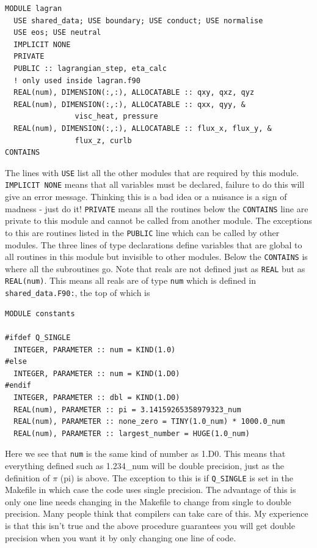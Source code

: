 \documentclass[11pt]{article}
\begin{document}
\begin{verbatim}
MODULE lagran
  USE shared_data; USE boundary; USE conduct; USE normalise
  USE eos; USE neutral
  IMPLICIT NONE
  PRIVATE
  PUBLIC :: lagrangian_step, eta_calc
  ! only used inside lagran.f90
  REAL(num), DIMENSION(:,:), ALLOCATABLE :: qxy, qxz, qyz
  REAL(num), DIMENSION(:,:), ALLOCATABLE :: qxx, qyy, &
                visc_heat, pressure
  REAL(num), DIMENSION(:,:), ALLOCATABLE :: flux_x, flux_y, &
                flux_z, curlb
CONTAINS
\end{verbatim}
The lines with \texttt{USE} list all the other modules that are required by this module. \texttt{IMPLICIT NONE} means that all variables must be declared, failure to do this will give an error message. Thinking this is a bad idea or a nuisance is a sign of madness - just do it! \texttt{PRIVATE} means all the routines below the \texttt{CONTAINS} line are private to this module and cannot be called from another module. The exceptions to this are routines listed in the \texttt{PUBLIC} line which can be called by other modules. The three lines of type declarations define variables that are global to all routines in this module but invisible to other modules. Below the \texttt{CONTAINS} is where all the subroutines go. Note that reals are not defined just as \texttt{REAL} but as \texttt{REAL(num)}. This means all reals are of type \texttt{num} which is defined in {\texttt{shared\_data.F90:}}, the top of which is
\begin{verbatim}
MODULE constants

#ifdef Q_SINGLE
  INTEGER, PARAMETER :: num = KIND(1.0) 
#else
  INTEGER, PARAMETER :: num = KIND(1.D0) 
#endif
  INTEGER, PARAMETER :: dbl = KIND(1.D0)
  REAL(num), PARAMETER :: pi = 3.14159265358979323_num
  REAL(num), PARAMETER :: none_zero = TINY(1.0_num) * 1000.0_num
  REAL(num), PARAMETER :: largest_number = HUGE(1.0_num)
\end{verbatim}
Here we see that \texttt{num} is the same kind of number as 1.D0. This means that everything defined such as 1.234\_num will be double precision, just as the definition of $\pi$ (pi) is above. The exception to this is if \texttt{Q\_SINGLE} is set in the Makefile in which case the code uses single precision. The advantage of this is only one line needs changing in the Makefile to change from single to double precision. Many people think that compilers can take care of this. My experience is that this isn't true and the above procedure guarantees you will get double precision when you want it by only changing one line of code.
\end{document}
